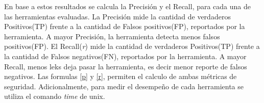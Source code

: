 En base a estos resultados se calcula la Precisión y el Recall, para cada una de
las herramientas evaluadas. La Precisión mide la cantidad de verdaderos
Positivos(TP) frente a la cantidad de Falsos positivos(FP), reportados por la
herramienta. A mayor Precisión, la herramienta detecta menos falsos
positivos(FP).\newline 
El Recall(\textit{r}) mide la cantidad de verdaderos Positivos(TP) frente a la
cantidad de Falsos negativos(FN), reportados por la herramienta. A mayor Recall,
menos leks deja pasar la herramienta, es decir menor reporte de falsos
negativos. Las formulas \ref{p} y \ref{r}, permiten el calculo de ambas métricas
de seguridad.\newline
Adicionalmente, para medir el desempeño de cada herramienta se utiliza el
comando \textit{time}\cite{time-man} de unix. 

